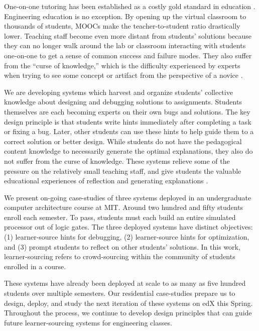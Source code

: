 \documentclass{sigchi}
\begin{document}
One-on-one tutoring has been established as a costly gold standard in education \cite{Bloom}. Engineering education is no exception. By opening up the virtual classroom to thousands of students, MOOCs make the teacher-to-student ratio drastically lower. Teaching staff become even more distant from students' solutions because they can no longer walk around the lab or classroom interacting with students one-on-one to get a sense of common success and failure modes. They also suffer from the ``curse of knowledge,'' which is the difficulty experienced by experts when trying to see some concept or artifact from the perspective of a novice \cite{curse}.

We are developing systems which harvest and organize students' collective knowledge about designing and debugging solutions to assignments. Students themselves are each becoming experts on their own bugs and solutions. The key design principle is that students write hints immediately after completing a task or fixing a bug. Later, other students can use these hints to help guide them to a correct solution or better design. While students do not have the pedagogical content knowledge to necessarily generate the optimal explanations, they also do not suffer from the curse of knowledge. These systems relieve some of the pressure on the relatively small teaching staff, and give students the valuable educational experiences of reflection and generating explanations \cite{selfexplanation}. 

We present on-going case-studies of three systems deployed in an undergraduate computer architecture course at MIT. Around two hundred and fifty students enroll each semester. To pass, students must each build an entire simulated processor out of logic gates. The three deployed systems have distinct objectives: (1) learner-source hints for debugging, (2) learner-source hints for optimization, and (3) prompt students to reflect on other students' solutions. In this work, learner-sourcing refers to crowd-sourcing within the community of students enrolled in a course.

These systems have already been deployed at scale to as many as five hundred students over multiple semesters. Our residential case-studies prepare us to design, deploy, and study the next iteration of these systems on edX this Spring. Throughout the process, we continue to develop design principles that can guide future learner-sourcing systems for engineering classes.
\end{document}
